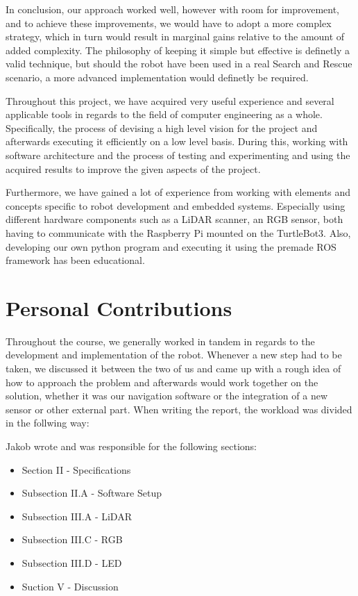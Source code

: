 \documentclass[conference]{IEEEtran}
\begin{document}
In conclusion, our approach worked well, however with room for improvement, and to achieve these improvements, we would have to adopt a more complex strategy, which in turn would result in marginal gains relative to the amount of added complexity.
The philosophy of keeping it simple but effective is definetly a valid technique, but should the robot have been used in a real Search and Rescue scenario, a more advanced implementation would definetly be required.

Throughout this project, we have acquired very useful experience and several applicable tools in regards to the field of computer engineering as a whole.
Specifically, the process of devising a high level vision for the project and afterwards executing it efficiently on a low level basis.
During this, working with software architecture and the process of testing and experimenting and using the acquired results to improve the given aspects of the project.

Furthermore, we have gained a lot of experience from working with elements and concepts specific to robot development and embedded systems.
Especially using different hardware components such as a LiDAR scanner, an RGB sensor, both having to communicate with the Raspberry Pi mounted on the TurtleBot3.
Also, developing our own python program and executing it using the premade ROS framework has been educational.

\section{Personal Contributions}
Throughout the course, we generally worked in tandem in regards to the development and implementation of the robot.
Whenever a new step had to be taken, we discussed it between the two of us and came up with a rough idea of how to approach the problem and afterwards would work together on the solution, whether it was our navigation software or the integration of a new sensor or other external part.
When writing the report, the workload was divided in the follwing way:

Jakob wrote and was responsible for the following sections:
\begin{itemize}
    \item Section II - Specifications
    \item Subsection II.A - Software Setup
    \item Subsection III.A - LiDAR
    \item Subsection III.C - RGB
    \item Subsection III.D - LED
    \item Suction V - Discussion
\end{itemize}
\end{document}
